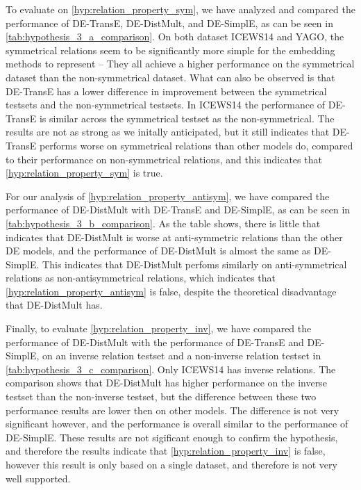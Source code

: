 To evaluate on \autoref{hyp:relation_property_sym}, we have analyzed and compared the performance of DE-TransE, DE-DistMult, and DE-SimplE, as can be seen in \autoref{tab:hypothesis_3_a_comparison}.
On both dataset ICEWS14 and YAGO, the symmetrical relations seem to be significantly more simple for the embedding methods to represent -- They all achieve a higher performance on the symmetrical dataset than the non-symmetrical dataset. What can also be observed is that DE-TransE has a lower difference in improvement between the symmetrical testsets and the non-symmetrical testsets. In ICEWS14 the performance of DE-TransE is similar across the symmetrical testset as the non-symmetrical. The results are not as strong as we initally anticipated, but it still indicates that DE-TransE performs worse on symmetrical relations than other models do, compared to their performance on non-symmetrical relations, and this indicates that \autoref{hyp:relation_property_sym} is true.

For our analysis of \autoref{hyp:relation_property_antisym}, we have compared the performance of DE-DistMult with DE-TransE and DE-SimplE, as can be seen in \autoref{tab:hypothesis_3_b_comparison}.
As the table shows, there is little that indicates that DE-DistMult is worse at anti-symmetric relations than the other DE models, and the performance of DE-DistMult is almost the same as DE-SimplE. This indicates that DE-DistMult perfoms similarly on anti-symmetrical relations as non-antisymmetrical relations, which indicates that \autoref{hyp:relation_property_antisym} is false, despite the theoretical disadvantage that DE-DistMult has.

Finally, to evaluate \autoref{hyp:relation_property_inv}, we have compared the performance of DE-DistMult with the performance of DE-TransE and DE-SimplE, on an inverse relation testset and a non-inverse relation testset in \autoref{tab:hypothesis_3_c_comparison}. Only ICEWS14 has inverse relations.
The comparison shows that DE-DistMult has higher performance on the inverse testset than the non-inverse testset, but the difference between these two performance results are lower then on other models. The difference is not very significant however, and the performance is overall similar to the performance of DE-SimplE. These results are not sigificant enough to confirm the hypothesis, and therefore the results indicate that \autoref{hyp:relation_property_inv} is false, however this result is only based on a single dataset, and therefore is not very well supported.

